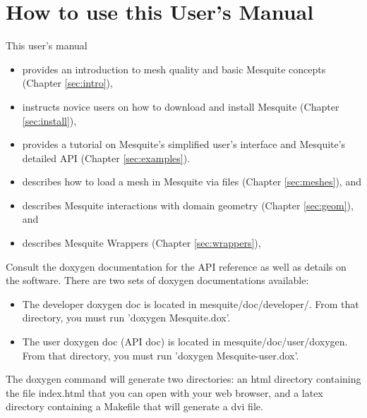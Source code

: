 \section{How to use this User's Manual}
This user's manual
\begin{itemize}
\item provides an introduction to mesh quality and basic Mesquite concepts (Chapter \ref{sec:intro}),
\item instructs novice users on how to download and install Mesquite (Chapter \ref{sec:install}),
\item provides a tutorial on Mesquite's simplified user's interface and Mesquite's detailed API (Chapter \ref{sec:examples}).
\item describes how to load a mesh in Mesquite via files (Chapter \ref{sec:meshes}), and
\item describes Mesquite interactions with domain geometry (Chapter \ref{sec:geom}), and
\item describes Mesquite Wrappers (Chapter \ref{sec:wrappers}),
\end{itemize}

Consult the doxygen documentation for the API reference as well as details on the software. There
are two sets of doxygen documentations available:
\begin{itemize}
\item The developer doxygen doc is located in mesquite/doc/developer/. From that directory, you
      must run 'doxygen Mesquite.dox'.
\item The user doxygen doc (API doc) is located in mesquite/doc/user/doxygen. From that directory, you
      must run 'doxygen Mesquite-user.dox'.
\end{itemize}
The doxygen command will generate two directories: an html directory containing the file
index.html that you can open with your web browser, and a latex directory containing a Makefile that
will generate a dvi file.

